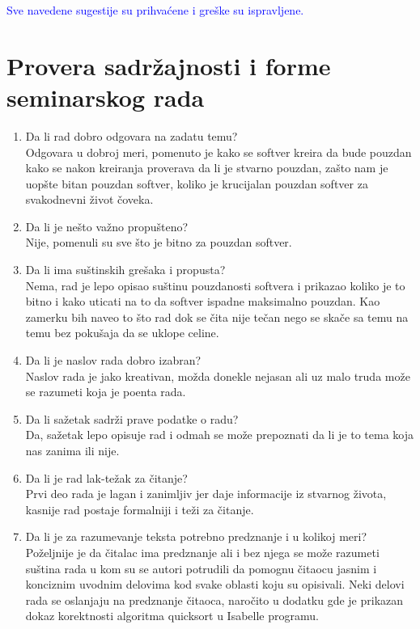 \documentclass[a4paper]{report}
\newcommand{\odgovor}[1]{\textcolor{blue}{#1}}
\begin{document}
\odgovor{
Sve navedene sugestije su prihvaćene i greške su ispravljene.
}

\section{Provera sadržajnosti i forme seminarskog rada}

\begin{enumerate}
\item Da li rad dobro odgovara na zadatu temu?\\Odgovara u dobroj meri, pomenuto je kako se softver kreira da bude pouzdan kako se nakon kreiranja proverava da li je stvarno pouzdan, zašto nam je uopšte bitan pouzdan softver, koliko je krucijalan pouzdan softver za svakodnevni život čoveka.
\item Da li je nešto važno propušteno?\\Nije, pomenuli su sve što je bitno za pouzdan softver.
\item Da li ima suštinskih grešaka i propusta?\\Nema, rad je lepo opisao suštinu pouzdanosti softvera i prikazao koliko je to bitno i kako uticati na to da softver ispadne maksimalno pouzdan. Kao zamerku bih naveo to što rad dok se čita nije tečan nego se skače sa temu na temu bez pokušaja da se uklope celine.
\item Da li je naslov rada dobro izabran?\\Naslov rada je jako kreativan, možda donekle nejasan ali uz malo truda može se razumeti koja je poenta rada.
\item Da li sažetak sadrži prave podatke o radu?\\Da, sažetak lepo opisuje rad i odmah se može prepoznati da li je to tema koja nas zanima ili nije.
\item Da li je rad lak-težak za čitanje?\\Prvi deo rada je lagan i zanimljiv jer daje informacije iz stvarnog života, kasnije rad postaje formalniji i teži za čitanje.
\item Da li je za razumevanje teksta potrebno predznanje i u kolikoj meri?\\ Poželjnije je da čitalac ima predznanje ali i bez njega se može razumeti suština rada u kom su se autori potrudili da pomognu čitaocu jasnim i konciznim uvodnim delovima kod svake oblasti koju su opisivali. Neki delovi rada se oslanjaju na predznanje čitaoca, naročito u dodatku gde je prikazan dokaz korektnosti algoritma quicksort u Isabelle programu.

\end{enumerate}
\end{document}

